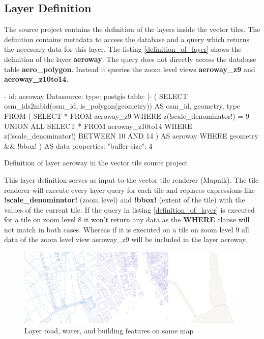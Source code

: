 \subsection{Layer Definition}

The source project contains the definition of the layers inside the vector tiles. The definition contains metadata to access the database and a query which returns the necessary data for this layer. The listing \autoref{definition_of_layer} shows the definition of the layer \textbf{aeroway}. The query does not directly access the database table \textbf{aero\_polygon}. Instead it queries the zoom level views \textbf{aeroway\_z9} and \textbf{aeroway\_z10to14}.

\begin{listing}[H]
\begin{yamlcode}
- id: aeroway
    Datasource: 
      type: postgis
      table: |-
        (
          SELECT osm_ids2mbid(osm_id, is_polygon(geometry)) AS osm_id, geometry, type
          FROM (
            SELECT * FROM aeroway_z9
            WHERE z(!scale_denominator!) = 9
            UNION ALL
            SELECT * FROM aeroway_z10to14
            WHERE z(!scale_denominator!) BETWEEN 10 AND 14
          ) AS aeroway WHERE geometry && !bbox!
        ) AS data
    properties: 
      "buffer-size": 4
\end{yamlcode}
\caption{Definition of layer aeroway in the vector tile source project}
\label{definition_of_layer}
\end{listing}

This layer definition serves as input to the vector tile renderer (Mapnik). The tile renderer will execute every layer query for each tile and replaces expressions like \textbf{!scale\_denominator!} (zoom level) and \textbf{!bbox!} (extent of the tile) with the values of the current tile. If the query in listing \autoref{definition_of_layer} is executed for a tile on zoom level 8 it won't return any data as the \textbf{WHERE} clause will not match in both cases.
Whereas if it is executed on a tile on zoom level 9 all data of the zoom level view aeroway\_z9 will be included in the layer aeroway.

\begin{figure}[H]
\centering
\includegraphics[width=\textwidth]{images/road_water_building}
\caption{Layer road, water, and building features on same map}
\end{figure}

